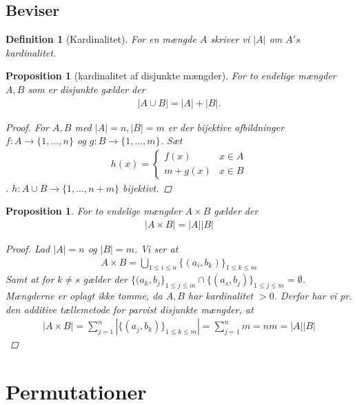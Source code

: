 \documentclass[10pt,twoside,openany,final]{memoir}
\theoremstyle{break}
\newtheorem{proposition}[section]{Proposition}
\newtheorem{definition}[section]{Definition}
\theoremstyle{Break}
\begin{document}
\section*{Beviser}
\begin{definition}[Kardinalitet]
For en mængde $A$ skriver vi $|A|$ om $A's$ kardinalitet.
\end{definition}

\begin{proposition}[kardinalitet af disjunkte mængder]
For to endelige mængder $A,B$ som er disjunkte gælder der
\begin{align*}
|A \cup B| = |A|+|B|.
\end{align*}
\begin{proof}
For $A,B$ med $|A|=n, |B|=m$ er der bijektive afbildninger $f \colon A \to \{1,\dots,n\}$ og $g \colon B \to \{1,\dots,m\}$. Sæt
\begin{align*}
h(x)=\begin{cases}
f(x) & x \in A \\
m+g(x) & x \in B
\end{cases}
\end{align*}.
$h \colon A \cup B \to \{1,\dots,n+m\}$ bijektivt.
\end{proof}
\end{proposition}

\begin{proposition}
For to endelige mængder $A \times B$ gælder der
\begin{align*}
|A \times B|=|A||B|
\end{align*}
\begin{proof}
Lad $|A|=n$ og $|B|=m$. Vi ser at 
\begin{align*}
A \times B = \bigcup_{1 \leq i \leq n}\{ (a_{i},b_{k})\}_{1 \leq k \leq m} 
\end{align*}
Samt at for $k \neq s$ gælder der $\{(a_{k},b_{j} \}_{1 \leq j \leq m} \cap \{ (a_{s},b_{j})\}_{1 \leq j \leq m}=\emptyset$. Mængderne er oplagt ikke tomme, da $A,B$ har kardinalitet $>0$. Derfor har vi pr. den additive tællemetode for parvist disjunkte mængder, at
\begin{align*}
|A \times B| = \sum_{j=1}^n |\{(a_{j},b_{k})\}_{1 \leq k \leq m}|=\sum_{j=1}^nm=nm=|A| |B|
\end{align*}
\end{proof}
\end{proposition}
\chapter{Permutationer}
\end{document}

